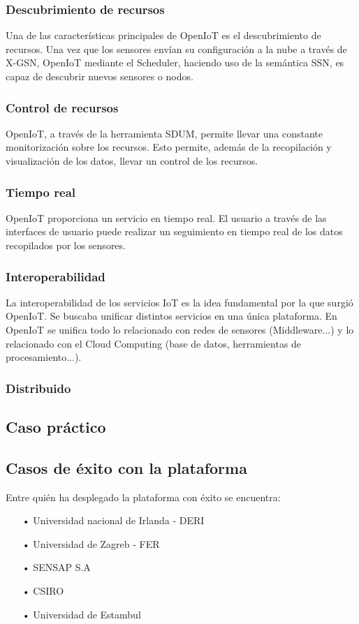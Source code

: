 \documentclass[12pt, twoside]{book}
\begin{document}
\subsubsection*{Descubrimiento de recursos}
Una de las características principales de OpenIoT es el descubrimiento de recursos. Una vez que los sensores envían su configuración a la nube a través de X-GSN, OpenIoT mediante el Scheduler, haciendo uso de la semántica SSN, es capaz de descubrir nuevos sensores o nodos.
\subsubsection*{Control de recursos}
OpenIoT, a través de la herramienta SDUM, permite llevar una constante monitorización sobre los recursos. Esto permite, además de la recopilación y visualización de los datos, llevar un control de los recursos.  
\subsubsection*{Tiempo real}
OpenIoT proporciona un servicio en tiempo real. El usuario a través de las interfaces de usuario puede realizar un seguimiento en tiempo real de los datos recopilados por los sensores.
\subsubsection*{Interoperabilidad}
La interoperabilidad de los servicios IoT es la idea fundamental por la que surgió OpenIoT. Se buscaba unificar distintos servicios en una única plataforma. En OpenIoT se unifica todo lo relacionado con redes de sensores (Middleware...) y lo relacionado con el Cloud Computing (base de datos, herramientas de procesamiento...).
\subsubsection*{Distribuido}


\subsection{Caso práctico}

\subsection{Casos de éxito con la plataforma}
Entre quién ha desplegado la plataforma con éxito se encuentra:
\begin{itemize}
\item[•] Universidad nacional de Irlanda - DERI
\item[•] Universidad de Zagreb - FER
\item[•] SENSAP S.A
\item[•] CSIRO
\item[•] Universidad de Estambul
\end{itemize}
\end{document}
